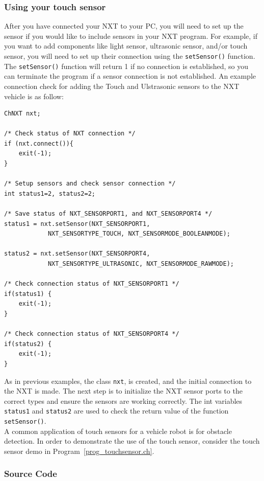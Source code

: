 \documentclass[11pt]{article}
\begin{document}
\subsubsection{Using your touch sensor}
After you have connected your NXT to your PC, you will need to set up the sensor if you would like to include 
sensors in your NXT program. For example, if you want to add components like light sensor, ultrasonic sensor, 
and/or touch sensor, you will need to set up their connection using the \verb+setSensor()+ function. 
The \verb+setSensor()+ function will return 1 if no connection is established, so you can terminate the 
program if a sensor connection is not established. An example connection check for adding the Touch and 
Ulstrasonic sensors to the NXT vehicle is as follow:
\begin{verbatim}
ChNXT nxt;

/* Check status of NXT connection */
if (nxt.connect()){
    exit(-1);
}

/* Setup sensors and check sensor connection */
int status1=2, status2=2;

/* Save status of NXT_SENSORPORT1, and NXT_SENSORPORT4 */
status1 = nxt.setSensor(NXT_SENSORPORT1, 
            NXT_SENSORTYPE_TOUCH, NXT_SENSORMODE_BOOLEANMODE);

status2 = nxt.setSensor(NXT_SENSORPORT4,
            NXT_SENSORTYPE_ULTRASONIC, NXT_SENSORMODE_RAWMODE);
    
/* Check connection status of NXT_SENSORPORT1 */
if(status1) {
    exit(-1);
}
    
/* Check connection status of NXT_SENSORPORT4 */
if(status2) {
    exit(-1);
}
\end{verbatim}

As in previous examples, the class \verb+nxt+, is created, and the initial connection to the NXT is 
made. The next step is to initialize the NXT sensor ports to the correct types and ensure 
the sensors are working correctly. The int variables \verb+status1+ and \verb+status2+ are used to 
check the return value of the function \verb+setSensor()+.\\

A common application of touch sensors for a vehicle robot is for obstacle detection. In order to 
demonstrate the use of the touch sensor, consider the touch sensor demo in Program~\ref{prog_touchsensor.ch}.
\subsubsection*{Source Code}

\end{document}
